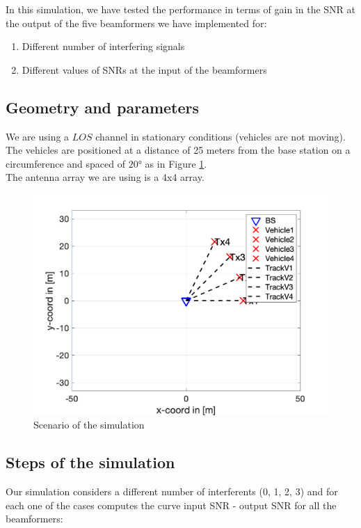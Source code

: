 In this simulation, we have tested the performance in terms of gain in the SNR at the output of the five
 beamformers we have implemented for:

\begin{enumerate}
    \item Different number of interfering signals
    \item Different values of SNRs at the input of the beamformers
\end{enumerate}

\subsection{Geometry and parameters}

We are using a $LOS$ channel in stationary conditions (vehicles are not moving). The vehicles are positioned at a 
distance of 25 meters from the base station on a circumference and spaced of $20°$ as in Figure \ref{fig:Scenario_circle}. \\ 
The antenna array we are using is a 4x4 array.

\begin{figure}[ht]
    \includegraphics[width=\linewidth]{Scenario_circle.png}
    \caption{Scenario of the simulation}
    \label{fig:Scenario_circle}
\end{figure}

\subsection{Steps of the simulation}

Our simulation considers a different number of interferents (0, 1, 2, 3) and for each one of the cases computes the 
curve input SNR - output SNR for all the beamformers:

